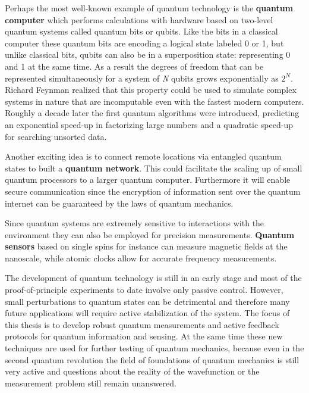 Perhaps the most well-known example of quantum technology is the \textbf{quantum computer}\cite{Nielsen__2000,Mermin__2007} which performs calculations with hardware based on two-level quantum systems called quantum bits or qubits. Like the bits in a classical computer these quantum bits are encoding a logical state labeled 0 or 1, but unlike classical bits, qubits can also be in a superposition state: representing 0 and 1 at the same time. As a result the degrees of freedom that can be represented simultaneously for a system of \textit{N} qubits grows exponentially as $2^N$. Richard Feynman realized that this property could be used to simulate complex systems in nature\cite{Feynman_IntJTheorPhys_1982} that are incomputable even with the fastest modern computers. Roughly a decade later the first quantum algorithms were introduced, predicting an exponential speed-up in factorizing large numbers\cite{Shor_SIAMJ.Comput._1997} and a quadratic speed-up for searching unsorted data\cite{Grover_Phys.Rev.Lett._1997}.

Another exciting idea is to connect remote locations via entangled quantum states to built a \textbf{quantum network}\cite{Kimble_Nature_2008}. This could facilitate the scaling up of small quantum processors to a larger quantum computer. Furthermore it will enable secure communication since the encryption of information sent over the quantum internet can be guaranteed by the laws of quantum mechanics\cite{Gisin_NatPhoton_2007}.

Since quantum systems are extremely sensitive to interactions with the environment they can also be employed for precision measurements. \textbf{Quantum sensors} based on single spins for instance can measure magnetic fields at the nanoscale\cite{Taylor_NatPhys_2008}, while atomic clocks allow for accurate frequency measurements\cite{Diddams_Science_2001}.

The development of quantum technology is still in an early stage and most of the proof-of-principle experiments to date involve only passive control. However, small perturbations to quantum states can be detrimental and therefore many future applications will require active stabilization of the system\cite{Wiseman__2010,Devoret_Science_2013}. The focus of this thesis is to develop robust quantum measurements and active feedback protocols for quantum information and sensing. At the same time these new techniques are used for further testing of quantum mechanics, because even in the second quantum revolution the field of foundations of quantum mechanics is still very active and questions about the reality of the wavefunction\cite{Pusey_NatPhys_2012} or the measurement problem still remain unanswered\cite{}. 

